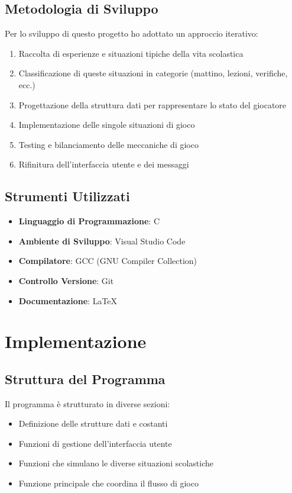 \documentclass[a4paper,12pt]{article}
\begin{document}
\subsection{Metodologia di Sviluppo}

Per lo sviluppo di questo progetto ho adottato un approccio iterativo:
\begin{enumerate}
    \item Raccolta di esperienze e situazioni tipiche della vita scolastica
    \item Classificazione di queste situazioni in categorie (mattino, lezioni, verifiche, ecc.)
    \item Progettazione della struttura dati per rappresentare lo stato del giocatore
    \item Implementazione delle singole situazioni di gioco
    \item Testing e bilanciamento delle meccaniche di gioco
    \item Rifinitura dell'interfaccia utente e dei messaggi
\end{enumerate}

\subsection{Strumenti Utilizzati}

\begin{itemize}
    \item \textbf{Linguaggio di Programmazione}: C
    \item \textbf{Ambiente di Sviluppo}: Visual Studio Code
    \item \textbf{Compilatore}: GCC (GNU Compiler Collection)
    \item \textbf{Controllo Versione}: Git
    \item \textbf{Documentazione}: \LaTeX
\end{itemize}

\section{Implementazione}

\subsection{Struttura del Programma}

Il programma è strutturato in diverse sezioni:

\begin{itemize}
    \item Definizione delle strutture dati e costanti
    \item Funzioni di gestione dell'interfaccia utente
    \item Funzioni che simulano le diverse situazioni scolastiche
    \item Funzione principale che coordina il flusso di gioco
\end{itemize}
\end{document}
